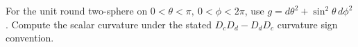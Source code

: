 For the unit round two-sphere on \(0<\theta<\pi,\ 0<\phi<2\pi\), use
\(g=d\theta^2+\sin^2\theta\,d\phi^2\). Compute the scalar curvature under
the stated \(D_cD_d-D_dD_c\) curvature sign convention.

